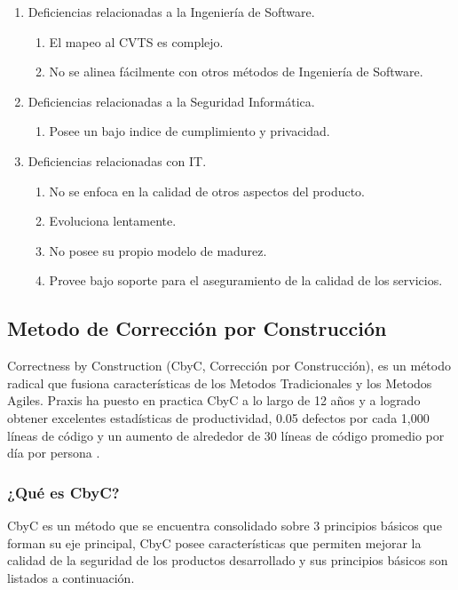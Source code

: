\documentclass[runningheads,a4paper]{llncs}
\begin{document}
\begin{enumerate}
	\item Deficiencias relacionadas a la Ingeniería de \gls{Software}.
		\begin{enumerate}
			\item El mapeo al \gls{CVTS} es complejo.
			\item No se alinea fácilmente con otros métodos de Ingeniería de Software.\\
			
		\end{enumerate}
	\item Deficiencias relacionadas a la Seguridad Informática.
		\begin{enumerate}
			\item Posee un bajo indice de cumplimiento y privacidad.\\
			
		\end{enumerate}
	\item Deficiencias relacionadas con \gls{IT}.
		\begin{enumerate}
			\item No se enfoca en la calidad de otros aspectos del producto.
			\item Evoluciona lentamente.
			\item No posee su propio modelo de madurez.
			\item Provee bajo soporte para el aseguramiento de la calidad de los servicios.\\
			
		\end{enumerate}
\end{enumerate}
\subsection{Metodo de Corrección por Construcción}
Correctness by Construction (CbyC, Corrección por Construcción), es un método radical que fusiona características de los \gls{Metodos Tradicionales} y los \gls{Metodos Agiles}. \gls{Praxis} ha puesto en practica \gls{CbyC} a lo largo de 12 años y a logrado obtener excelentes estadísticas de productividad, 0.05 defectos por cada 1,000 líneas de código y un aumento de alrededor de 30 líneas de código promedio por día por persona \cite{CbyCIntroduction}.   

\subsubsection{¿Qué es \gls{CbyC}?}
\gls{CbyC} es un método que se encuentra consolidado sobre 3 principios básicos que forman su eje principal, \gls{CbyC} posee características que permiten mejorar la calidad de la seguridad de los productos desarrollado y sus principios básicos son listados a continuación.
\end{document}
